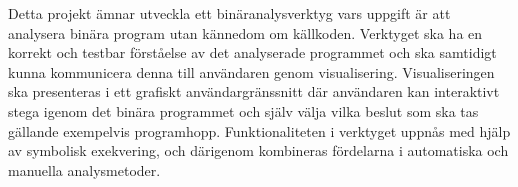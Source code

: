 Detta projekt ämnar utveckla ett binäranalysverktyg vars uppgift är att
analysera binära program utan kännedom om källkoden. Verktyget ska ha en korrekt
och testbar förståelse av det analyserade programmet och ska samtidigt kunna
kommunicera denna till användaren genom visualisering. Visualiseringen ska
presenteras i ett grafiskt användargränssnitt där användaren kan interaktivt
stega igenom det binära programmet och själv välja vilka beslut som ska tas
gällande exempelvis programhopp. Funktionaliteten i verktyget uppnås med hjälp
av symbolisk exekvering, och därigenom kombineras fördelarna i automatiska och 
manuella analysmetoder.


